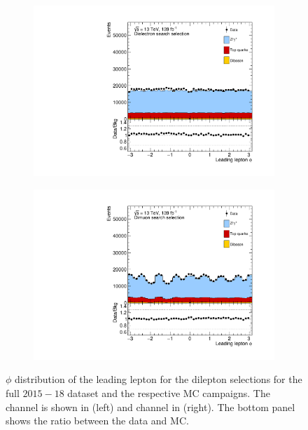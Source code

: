 \begin{figure}[]
    \centering
    \begin{subfigure}[b]{0.49\textwidth}
        \centering
        \includegraphics[width=\textwidth]{figures/analysis/datamc/dataMCcompare/ee_phi1.pdf}
        \label{fig:datamc:eephi1}
    \end{subfigure}
    \begin{subfigure}[b]{0.49\textwidth}
        \centering
        \includegraphics[width=\textwidth]{figures/analysis/datamc/dataMCcompare/uu_phi1.pdf}
        \label{fig:datamc:uuphi1}
    \end{subfigure}
    \caption[$\phi$ distribution of the leading lepton for the dilepton selections for the full $2015-18$ dataset and the respective MC campaigns.]{$\phi$ distribution of the leading lepton for the dilepton selections for the full $2015-18$ dataset and the respective MC campaigns. The \ee channel is shown in (left) and \mumu channel in (right). The bottom panel shows the ratio between the data and MC.}
    \label{fig:datamc:phi1}
\end{figure}

